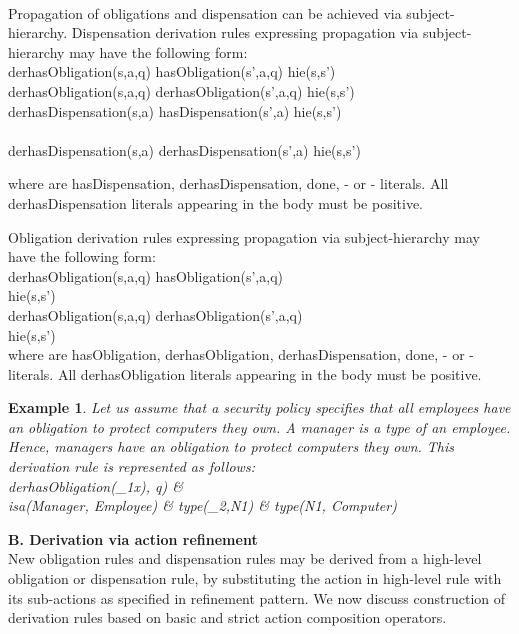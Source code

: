 \documentclass[12pt,journal,letterpaper,onecolumn]{IEEEtran}
\newtheorem{example}{Example}[section]
\begin{document}
\\
Propagation of obligations and dispensation can be achieved via
subject-hierarchy. Dispensation derivation rules expressing
propagation via subject-hierarchy may have the following form:\\
{\ttfamily derhasObligation(s,a,q) 
hasObligation(s',a,q)  hie(s,s')} \\
{\ttfamily derhasObligation(s,a,q) 
derhasObligation(s',a,q)  hie(s,s')} \\
{\ttfamily derhasDispensation(s,a) 
hasDispensation(s',a)  hie(s,s')   \\
\indent\indent\indent\indent    } \\
{\ttfamily derhasDispensation(s,a) 
derhasDispensation(s',a)  hie(s,s')}


where  are {\ttfamily hasDispensation,
derhasDispensation, done}, - or - literals. All {\ttfamily
derhasDispensation} literals appearing in the body must be
positive.

Obligation derivation rules expressing
propagation via subject-hierarchy may have the  following form:\\
{\ttfamily derhasObligation(s,a,q) 
hasObligation(s',a,q)  \\
\indent \indent \indent \indent \indent \indent \indent \indent
\indent\indent hie(s,s')  } \\
{\ttfamily derhasObligation(s,a,q) 
derhasObligation(s',a,q)  \\
\indent \indent \indent \indent \indent \indent \indent \indent
\indent\indent hie(s,s')  } \\
where  are {\ttfamily hasObligation,
derhasObligation, derhasDispensation, done}, - or -
literals. All {\ttfamily derhasObligation} literals appearing in the
body must be positive.


\begin{example}
Let us assume that a security policy specifies that all employees
have an obligation to protect computers they own. A manager is a
type of an employee. Hence, managers have an obligation to protect
computers they own. This derivation rule is represented as follows: \\

\noindent
{\ttfamily derhasObligation(\s_1x), q) \&
\\ \indent isa(Manager, Employee) \& type(\s_2,N1) \& type(N1, Computer)}
\end{example}

\noindent
{\bf B. Derivation via action refinement}\\
New obligation rules and dispensation rules may be derived from a
high-level obligation or dispensation rule, by substituting the
action in high-level rule with its sub-actions as specified in
refinement pattern. We now discuss construction of derivation rules
based on basic and strict action composition operators.
\end{document}
